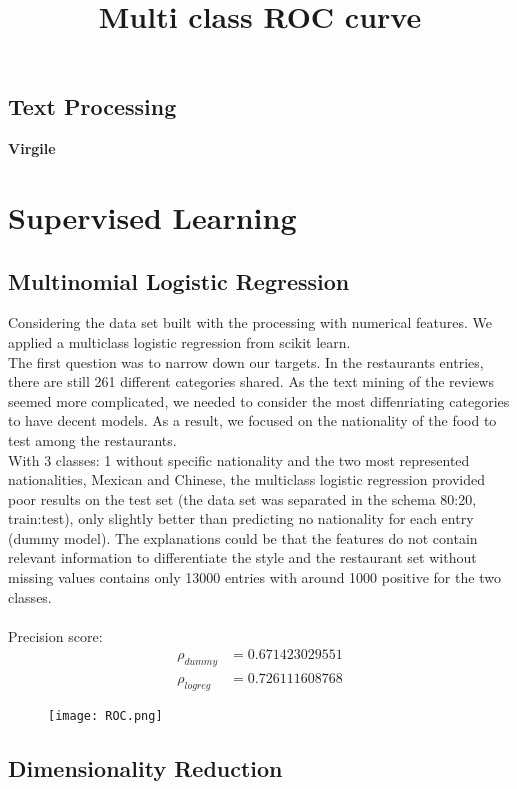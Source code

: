 \documentclass[submit]{harvardml}
\begin{document}
\subsection{Text Processing}

\textbf{Virgile}

\section{Supervised Learning} 

\subsection{Multinomial Logistic Regression}

Considering the data set built with the processing with numerical features. We applied a multiclass logistic regression from scikit learn. \\
The first question was to narrow down our targets. In the restaurants entries, there are still 261 different categories shared. As the text mining of the reviews seemed more complicated, we needed to consider the most diffenriating categories to have decent models. As a result, we focused on the nationality of the food to test among the restaurants.\\
With 3 classes: 1 without specific nationality and the two most represented nationalities, Mexican and Chinese, the multiclass logistic regression provided poor results on the test set (the data set was separated in the schema 80:20, train:test), only slightly better than predicting no nationality for each entry (dummy model). The explanations could be that the features do not contain relevant information to differentiate the style and the restaurant set without missing values contains only 13000 entries with around 1000 positive for the two classes.\\\\
Precision score:
\begin{align*}
	\rho_{dummy} & = 0.671423029551 \\
	\rho_{logreg} &  = 0.726111608768 
\end{align*}

\begin{figure}[H]
	\texttt{[image: ROC.png]}
	\centering
	\title{Multi class ROC curve}
\end{figure}




\subsection{Dimensionality Reduction}
\end{document}

